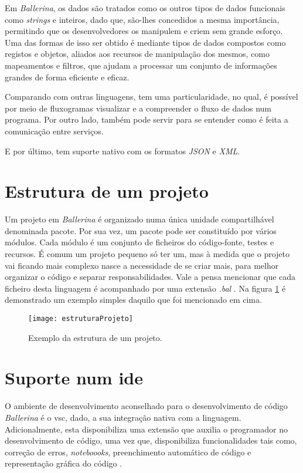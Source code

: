 Em \textit{Ballerina}, os dados são tratados como os outros tipos de dados funcionais como \textit{strings} e inteiros, dado que, são-lhes concedidos a mesma importância, permitindo que os desenvolvedores os manipulem e criem sem grande esforço. Uma das formas de isso ser obtido é mediante tipos de dados compostos como registos e objetos, aliados aos recursos de manipulação dos mesmos, como mapeamentos e filtros, que ajudam a processar um conjunto de informações grandes de forma eficiente e eficaz.

Comparando com outras linguagens, tem uma particularidade, no qual, é possível por meio de fluxogramas visualizar e a compreender o fluxo de dados num programa. Por outro lado, também pode servir para se entender como é feita a comunicação entre serviços.

E por último, tem suporte nativo com os formatos \textit{JSON} e \textit{XML}. \cite{ballerina}

\section{Estrutura de um projeto}
Um projeto em \textit{Ballerina} é organizado numa única unidade compartilhável denominada pacote. Por sua vez, um pacote pode ser constituído por vários módulos. Cada módulo é um conjunto de ficheiros do código-fonte, testes e recursos. É comum um projeto pequeno só ter um, mas à medida que o projeto vai ficando mais complexo nasce a necessidade de se criar mais, para melhor organizar o código e separar responsabilidades. Vale a pensa mencionar que cada ficheiro desta linguagem é acompanhado por uma extensão \textit{.bal} \cite{organizacaoCodigo}. Na figura \ref{fig:estruturaProjeto} é demonstrado um exemplo simples daquilo que foi mencionado em cima. 

\begin{figure}[H]
	\centering
	\texttt{[image: estruturaProjeto]}
	\caption{Exemplo da estrutura de um projeto.}
	\label{fig:estruturaProjeto}
\end{figure}

\section{Suporte num \ac{ide}}

O ambiente de desenvolvimento aconselhado para o desenvolvimento de código \textit{Ballerina} é o \ac{vsc}, dado, a sua integração nativa com a linguagem. Adicionalmente, esta disponibiliza uma extensão que auxilia o programador no desenvolvimento de código, uma vez que, disponibiliza funcionalidades tais como, correção de erros, \textit{noteboooks}, preenchimento automático de código e representação gráfica do código \cite{addon}.


